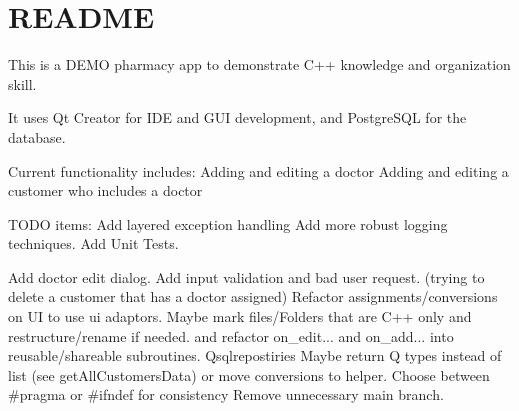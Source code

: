 \chapter{README}
\hypertarget{md_README}{}\label{md_README}
This is a DEMO pharmacy app to demonstrate C++ knowledge and organization skill.

It uses Qt Creator for IDE and GUI development, and Postgre\+SQL for the database.

Current functionality includes\+: Adding and editing a doctor Adding and editing a customer who includes a doctor

TODO items\+: Add layered exception handling Add more robust logging techniques. Add Unit Tests.

Add doctor edit dialog. Add input validation and bad user request. (trying to delete a customer that has a doctor assigned) Refactor assignments/conversions on UI to use ui adaptors. Maybe mark files/\+Folders that are C++ only and restructure/rename if needed.  and  refactor on\+\_\+edit... and on\+\_\+add... into reusable/shareable subroutines. Qsqlrepostiries Maybe return Q types instead of list (see get\+All\+Customers\+Data) or move conversions to helper. Choose between \#pragma or \#ifndef for consistency Remove unnecessary \textquotesingle{}main\textquotesingle{} branch. 